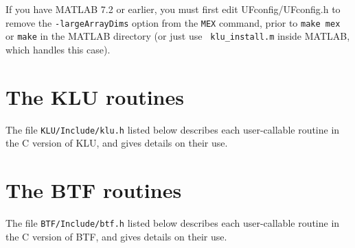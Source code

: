 \documentclass[11pt]{article}
\begin{document}
If you have MATLAB 7.2 or earlier, you must first edit UFconfig/UFconfig.h to
remove the {\tt -largeArrayDims} option from the {\tt MEX} command, prior to
{\tt make mex} or {\tt make} in the MATLAB directory (or just use {\tt
klu\_install.m} inside MATLAB, which handles this case).

\newpage
\section{The KLU routines}
\label{klu_include}

The file {\tt KLU/Include/klu.h} listed below describes each user-callable
routine in the C version of KLU, and gives details on their use.

{\footnotesize

}

\newpage
\section{The BTF routines}
\label{btf_include}

The file {\tt BTF/Include/btf.h} listed below describes each user-callable
routine in the C version of BTF, and gives details on their use.

{\footnotesize

}

\newpage



\end{document}

